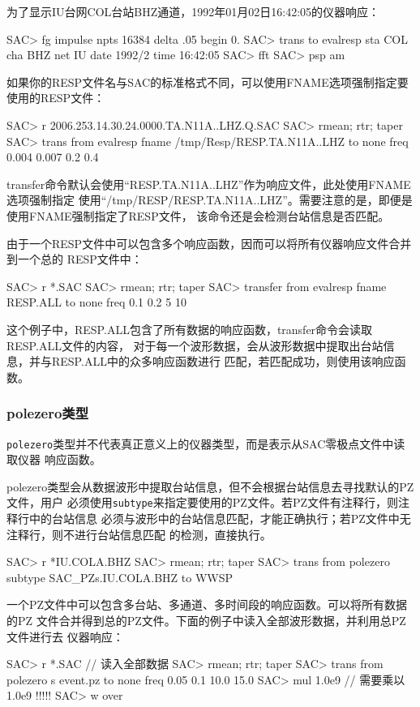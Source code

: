 为了显示IU台网COL台站BHZ通道，1992年01月02日16:42:05的仪器响应：
\begin{SACCode}
SAC> fg impulse npts 16384 delta .05 begin 0.
SAC> trans to evalresp sta COL cha BHZ net IU date 1992/2 time 16:42:05
SAC> fft
SAC> psp am
\end{SACCode}

如果你的RESP文件名与SAC的标准格式不同，可以使用FNAME选项强制指定要使用的RESP文件：
\begin{SACCode}
SAC> r 2006.253.14.30.24.0000.TA.N11A..LHZ.Q.SAC
SAC> rmean; rtr; taper
SAC> trans from evalresp fname /tmp/Resp/RESP.TA.N11A..LHZ to none freq 0.004 0.007 0.2 0.4
\end{SACCode}
transfer命令默认会使用``RESP.TA.N11A..LHZ''作为响应文件，此处使用FNAME选项强制指定
使用``/tmp/RESP/RESP.TA.N11A..LHZ''。需要注意的是，即便是使用FNAME强制指定了RESP文件，
该命令还是会检测台站信息是否匹配。

由于一个RESP文件中可以包含多个响应函数，因而可以将所有仪器响应文件合并到一个总的
RESP文件中：
\begin{SACCode}
SAC> r *.SAC
SAC> rmean; rtr; taper
SAC> transfer from evalresp fname RESP.ALL to none freq 0.1 0.2 5 10
\end{SACCode}
这个例子中，RESP.ALL包含了所有数据的响应函数，transfer命令会读取RESP.ALL文件的内容，
对于每一个波形数据，会从波形数据中提取出台站信息，并与RESP.ALL中的众多响应函数进行
匹配，若匹配成功，则使用该响应函数。

\subsubsection{polezero类型}
\verb+polezero+类型并不代表真正意义上的仪器类型，而是表示从SAC零极点文件中读取仪器
响应函数。

polezero类型会从数据波形中提取台站信息，但不会根据台站信息去寻找默认的PZ文件，用户
必须使用\verb+subtype+来指定要使用的PZ文件。若PZ文件有注释行，则注释行中的台站信息
必须与波形中的台站信息匹配，才能正确执行；若PZ文件中无注释行，则不进行台站信息匹配
的检测，直接执行。
\begin{SACCode}
SAC> r *IU.COLA.BHZ
SAC> rmean; rtr; taper
SAC> trans from polezero subtype SAC_PZs.IU.COLA.BHZ to WWSP
\end{SACCode}

一个PZ文件中可以包含多台站、多通道、多时间段的响应函数。可以将所有数据的PZ
文件合并得到总的PZ文件。下面的例子中读入全部波形数据，并利用总PZ文件进行去
仪器响应：
\begin{SACCode}
SAC> r *.SAC          // 读入全部数据
SAC> rmean; rtr; taper
SAC> trans from polezero s event.pz to none freq 0.05 0.1 10.0 15.0
SAC> mul 1.0e9        // 需要乘以1.0e9 !!!!!
SAC> w over
\end{SACCode}

